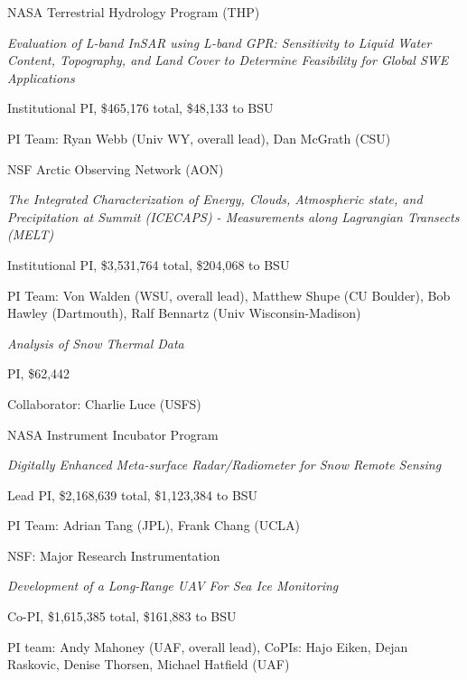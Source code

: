 \documentclass[11pt]{article}
\renewenvironment{itemize}{
  \begin{list}{}{
    \setlength{\leftmargin}{1.5em}
    \setlength{\itemsep}{0pt}
    \setlength{\parskip}{0pt}
  }
}{
  \end{list}
}
\begin{document}
\begin{itemize}
\item[1/2022-12/2024]  NASA Terrestrial Hydrology Program (THP) 
\begin{itemize}
\item \textit{Evaluation of L-band InSAR using L-band GPR: Sensitivity to Liquid Water Content, Topography, and Land Cover to Determine Feasibility for Global SWE Applications}
\item Institutional PI, \$465,176 total, \$48,133 to BSU 
\item PI Team: Ryan Webb (Univ WY, overall lead), Dan McGrath (CSU)
\end{itemize}

\item[1/2022-11/2024] NSF Arctic Observing Network (AON) 
\begin{itemize}
\item \textit{The Integrated Characterization of Energy, Clouds, Atmospheric state, and Precipitation at
Summit (ICECAPS) - Measurements along Lagrangian Transects (MELT)}
\item Institutional PI, \$3,531,764 total, \$204,068 to BSU
\item PI Team: Von Walden (WSU, overall lead), Matthew Shupe (CU Boulder), Bob Hawley (Dartmouth), Ralf Bennartz (Univ Wisconsin-Madison)
\end{itemize}

\item[10/2021-9/2024] 
\begin{itemize}
\item \textit{Analysis of Snow Thermal Data}
\item PI, \$62,442 
\item Collaborator: Charlie Luce (USFS)
\end{itemize}

\item[2/2020-1/2023] NASA Instrument Incubator Program
\begin{itemize}
\item \textit{Digitally Enhanced Meta-surface Radar/Radiometer for Snow Remote Sensing}
\item Lead PI, \$2,168,639 total, \$1,123,384 to BSU
\item PI Team: Adrian Tang (JPL), Frank Chang (UCLA)
\end{itemize}

\pagebreak

\item[9/2018-8/2022] NSF: Major Research Instrumentation
\begin{itemize}
  \item \textit{Development of a Long-Range UAV For Sea Ice Monitoring}
  \item Co-PI, \$1,615,385 total, \$161,883 to BSU
  \item PI team: Andy Mahoney (UAF, overall lead),  CoPIs: Hajo Eiken, Dejan Raskovic,  Denise Thorsen, Michael Hatfield (UAF)
\end{itemize}


\end{itemize}
\end{document}
